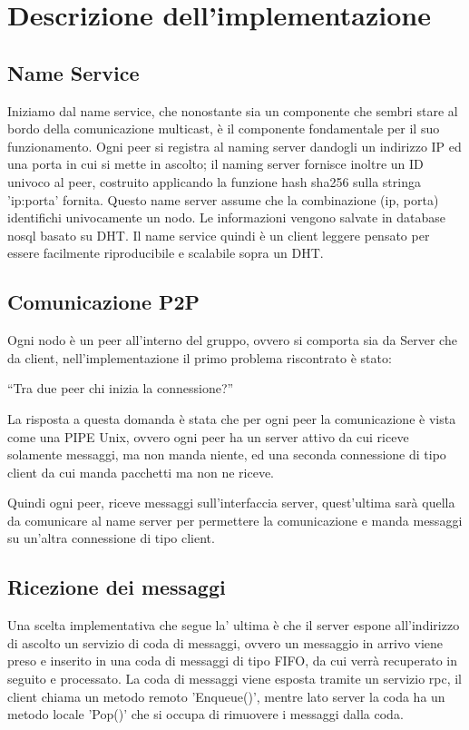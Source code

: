 \documentclass[conference]{IEEEtran}
\begin{document}
 \section{Descrizione dell'implementazione}
 \subsection{Name Service}
 Iniziamo dal name service, che nonostante sia un componente che sembri stare al
 bordo della comunicazione multicast, è il componente fondamentale per il suo
 funzionamento.
 Ogni peer si registra al naming server dandogli un indirizzo IP
 ed una porta in cui si mette in ascolto; il naming server fornisce inoltre un ID
 univoco al peer, costruito applicando la funzione hash sha256 sulla stringa
 'ip:porta' fornita.
 Questo name server assume che la combinazione (ip, porta) identifichi
 univocamente un nodo.
 Le informazioni vengono salvate in database nosql basato su DHT.
 Il name service quindi è un client leggere pensato per essere facilmente
 riproducibile e scalabile sopra un DHT.
 \subsection{Comunicazione P2P}
 Ogni nodo è un peer all'interno del gruppo, ovvero si comporta sia da Server
 che da client, nell'implementazione il primo problema riscontrato è stato:

 “Tra due peer chi inizia la connessione?”

 La risposta a questa domanda è stata che per ogni peer la comunicazione è vista
 come una PIPE Unix, ovvero ogni peer ha un server attivo da cui riceve
 solamente messaggi, ma non manda niente, ed una seconda connessione di tipo client da
 cui manda pacchetti ma non ne riceve.

 Quindi ogni peer, riceve messaggi sull'interfaccia server, quest'ultima sarà
 quella da comunicare al name server per permettere la comunicazione e manda messaggi su un'altra connessione di tipo client.
\subsection{Ricezione dei messaggi}
 Una scelta implementativa che segue la' ultima è che il server espone
 all'indirizzo di ascolto un servizio di coda di messaggi, ovvero un messaggio in arrivo viene preso
 e inserito in una coda di messaggi di tipo FIFO, da cui verrà recuperato in
 seguito e processato.
 La coda di messaggi viene esposta tramite un servizio rpc, il client chiama un
 metodo remoto 'Enqueue()', mentre lato server la coda ha un metodo locale
 'Pop()' che si occupa di rimuovere i messaggi dalla coda.
\end{document}
